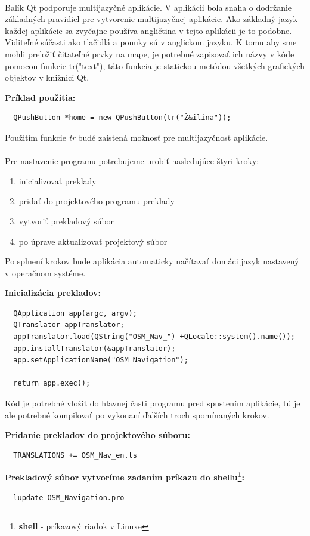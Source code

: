 \paragraph{}
Balík Qt podporuje multijazyčné aplikácie. V aplikácii bola snaha o dodržanie základných pravidiel pre vytvorenie multijazyčnej aplikácie. Ako základný jazyk každej aplikácie sa zvyčajne používa angličtina v tejto aplikácii je to podobne. Viditeľné súčasti ako tlačidlá a ponuky sú v anglickom jazyku. K tomu aby sme mohli preložiť čitateľné prvky na mape, je potrebné zapisovať ich názvy v kóde pomocou funkcie tr("text"), táto funkcia je statickou metódou všetkých grafických objektov v knižnici Qt.
\begin{flushleft}
\textbf{Príklad použitia:}
\begin{verbatim}
  QPushButton *home = new QPushButton(tr("Ž&ilina")); 
\end{verbatim}
\end{flushleft}

Použitím funkcie \textit{tr} budé zaistená možnosť pre multijazyčnosť aplikácie.\\\\
Pre nastavenie programu potrebujeme urobiť nasledujúce štyri kroky:
\begin{enumerate}
\item inicializovať preklady
\item pridať do projektového programu preklady
\item vytvoriť prekladový súbor
\item po úprave aktualizovať projektový súbor
\end{enumerate}
Po splnení krokov bude aplikácia automaticky načítavať domáci jazyk nastavený v operačnom systéme.
\begin{flushleft}
\textbf{Inicializácia prekladov:}
\begin{verbatim}
  QApplication app(argc, argv);
  QTranslator appTranslator;
  appTranslator.load(QString("OSM_Nav_") +QLocale::system().name());
  app.installTranslator(&appTranslator);
  app.setApplicationName("OSM_Navigation");

  return app.exec();
\end{verbatim} 
\end{flushleft}


Kód je potrebné vložiť do hlavnej časti programu pred spustením aplikácie, tú je ale potrebné kompilovať po vykonaní ďalších troch spomínaných krokov.
\begin{flushleft}
\textbf{Pridanie prekladov do projektového súboru:}
\begin{verbatim}
  TRANSLATIONS += OSM_Nav_en.ts
\end{verbatim} 

\textbf{Prekladový súbor vytvoríme zadaním príkazu do shellu\footnote{\textbf{shell} - príkazový riadok v Linuxe}:}
\begin{verbatim}
  lupdate OSM_Navigation.pro
\end{verbatim} 
\end{flushleft}

